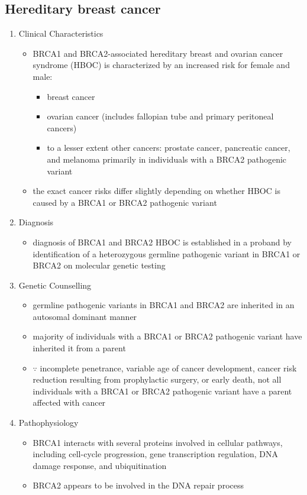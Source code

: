 \documentclass[12pt]{scrartcl}
\begin{document}
\subsection{Hereditary breast cancer}
\label{sec:org1b07ad7}
\begin{enumerate}
\item Clinical Characteristics
\label{sec:orgbe52e2e}
\begin{itemize}
\item BRCA1 and BRCA2-associated hereditary breast and ovarian cancer
syndrome (HBOC) is characterized by an increased risk for female and
male:
\begin{itemize}
\item breast cancer
\item ovarian cancer (includes fallopian tube and primary peritoneal cancers)
\item to a lesser extent other cancers: prostate cancer, pancreatic
cancer, and melanoma primarily in individuals with a BRCA2
pathogenic variant
\end{itemize}
\item the exact cancer risks differ slightly depending on whether HBOC is
caused by a BRCA1 or BRCA2 pathogenic variant
\end{itemize}
\item Diagnosis
\label{sec:org0611f1c}
\begin{itemize}
\item diagnosis of BRCA1 and BRCA2 HBOC is established in a proband by
identification of a heterozygous germline pathogenic variant in
BRCA1 or BRCA2 on molecular genetic testing
\end{itemize}

\item Genetic Counselling
\label{sec:org600b4c2}
\begin{itemize}
\item germline pathogenic variants in BRCA1 and BRCA2 are inherited in an
autosomal dominant manner
\item majority of individuals with a BRCA1 or BRCA2 pathogenic variant
have inherited it from a parent
\item \(\because\) incomplete penetrance, variable age of cancer development,
cancer risk reduction resulting from prophylactic surgery, or early
death, not all individuals with a BRCA1 or BRCA2 pathogenic variant
have a parent affected with cancer
\end{itemize}

\item Pathophysiology
\label{sec:orga8cf08d}
\begin{itemize}
\item BRCA1 interacts with several proteins involved in cellular pathways,
including cell-cycle progression, gene transcription regulation, DNA
damage response, and ubiquitination
\item BRCA2 appears to be involved in the DNA repair process
\end{itemize}
\end{enumerate}
\end{document}
